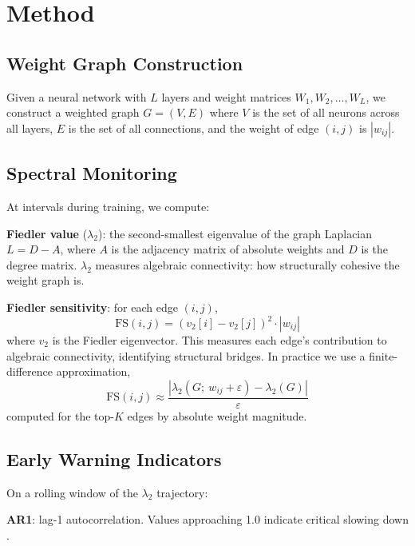 \documentclass[10pt,twocolumn]{article}
\begin{document}
\section{Method}

\subsection{Weight Graph Construction}

Given a neural network with $L$ layers and weight matrices $W_1, W_2, \ldots, W_L$, we construct a weighted graph $G = (V, E)$ where $V$ is the set of all neurons across all layers, $E$ is the set of all connections, and the weight of edge $(i, j)$ is $|w_{ij}|$.

\subsection{Spectral Monitoring}

At intervals during training, we compute:

\textbf{Fiedler value} ($\lambda_2$): the second-smallest eigenvalue of the graph Laplacian $L = D - A$, where $A$ is the adjacency matrix of absolute weights and $D$ is the degree matrix. $\lambda_2$ measures algebraic connectivity: how structurally cohesive the weight graph is.

\textbf{Fiedler sensitivity}: for each edge $(i, j)$,
\begin{equation}
  \mathrm{FS}(i,j) = (v_2[i] - v_2[j])^2 \cdot |w_{ij}|
\end{equation}
where $v_2$ is the Fiedler eigenvector. This measures each edge's contribution to algebraic connectivity, identifying structural bridges. In practice we use a finite-difference approximation,
\begin{equation}
  \mathrm{FS}(i,j) \approx \frac{|\lambda_2(G;\ w_{ij}{+}\varepsilon) - \lambda_2(G)|}{\varepsilon}
\end{equation}
computed for the top-$K$ edges by absolute weight magnitude.

\subsection{Early Warning Indicators}

On a rolling window of the $\lambda_2$ trajectory:

\textbf{AR1}: lag-1 autocorrelation. Values approaching 1.0 indicate critical slowing down \citep{scheffer2009early}.
\end{document}
